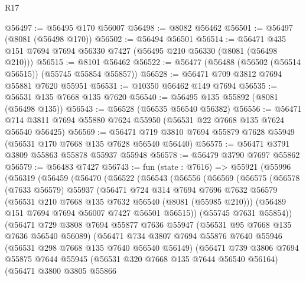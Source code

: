 \begin{lexlean}{R17}
\begin{coremodule}
@56497 := @56495 @170 @56007
@56498 := @8082 @56462
@56501 := @56497 (@8081 (@56498 @170))
@56502 := @56494 @56501
@56514 := @56471 @435 @151 @7694 @7694 @56330 @7427 (@56495 @210 @56330 (@8081 (@56498 @210)))
@56515 := @8101 @56462
@56522 := @56477 (@56488 (@56502 (@56514 @56515)) (@55745 @55854 @55857))
@56528 := @56471 @709 @3812 @7694 @55881 @7620 @55951
@56531 := @10350 @56462 @149 @7694
@56535 := @56531 @135 @7668 @135 @7620
@56540 := @56495 @135 @55892 (@8081 (@56498 @135))
@56543 := @56528 (@56535 @56540 @56382)
@56556 := @56471 @714 @3811 @7694 @55880 @7624 @55950 (@56531 @22 @7668 @135 @7624 @56540 @56425)
@56569 := @56471 @719 @3810 @7694 @55879 @7628 @55949 (@56531 @170 @7668 @135 @7628 @56540 @56440)
@56575 := @56471 @3791 @3809 @55863 @55878 @55937 @55948
@56578 := @56479 @3790 @7697 @55862
@56579 := @56483 @7427
@56743 := fun (state : @7616) =>
  @55921
    (@55996
      (@56319
        (@56459
          (@56470
            (@56522
              (@56543
                (@56556
                  (@56569
                    (@56575
                      (@56578
                        (@7633 @56579)
                        @55937
                        (@56471
                          @724
                          @314
                          @7694
                          @7696
                          @7632
                          @56579
                          (@56531 @210 @7668 @135 @7632 @56540 (@8081 (@55985 @210)))
                          (@56489 @151 @7694 @7694 @56007 @7427 @56501 @56515))
                        (@55745 @7631 @55854))
                      (@56471
                        @729
                        @3808
                        @7694
                        @55877
                        @7636
                        @55947
                        (@56531 @95 @7668 @135 @7636 @56540 @56089)
                        (@56471
                          @734
                          @3807
                          @7694
                          @55876
                          @7640
                          @55946
                          (@56531 @298 @7668 @135 @7640 @56540 @56149)
                          (@56471
                            @739
                            @3806
                            @7694
                            @55875
                            @7644
                            @55945
                            (@56531 @320 @7668 @135 @7644 @56540 @56164)
                            (@56471
                              @3800
                              @3805
                              @55866

\end{coremodule}
\end{lexlean}
